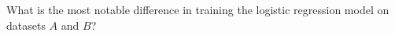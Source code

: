\item {}
What is the most notable difference in training the logistic regression model
on datasets $A$ and $B$?
